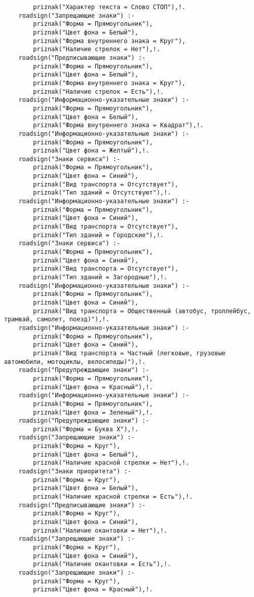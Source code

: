 \begin{verbatim}
		priznak("Характер текста = Слово СТОП"),!.
	roadsign("Запрещающие знаки") :-
		priznak("Форма = Прямоугольник"),
		priznak("Цвет фона = Белый"),
		priznak("Форма внутреннего знака = Круг"),
		priznak("Наличие стрелок = Нет"),!.
	roadsign("Предписывающие знаки") :-
		priznak("Форма = Прямоугольник"),
		priznak("Цвет фона = Белый"),
		priznak("Форма внутреннего знака = Круг"),
		priznak("Наличие стрелок = Есть"),!.
	roadsign("Информационно-указательные знаки") :-
		priznak("Форма = Прямоугольник"),
		priznak("Цвет фона = Белый"),
		priznak("Форма внутреннего знака = Квадрат"),!.
	roadsign("Информационно-указательные знаки") :-
		priznak("Форма = Прямоугольник"),
		priznak("Цвет фона = Желтый"),!.
	roadsign("Знаки сервиса") :-
		priznak("Форма = Прямоугольник"),
		priznak("Цвет фона = Синий"),
		priznak("Вид транспорта = Отсутствует"),
		priznak("Тип зданий = Отсутствуют"),!.
	roadsign("Информационно-указательные знаки") :-
		priznak("Форма = Прямоугольник"),
		priznak("Цвет фона = Синий"),
		priznak("Вид транспорта = Отсутствует"),
		priznak("Тип зданий = Городские"),!.
	roadsign("Знаки сервиса") :-
		priznak("Форма = Прямоугольник"),
		priznak("Цвет фона = Синий"),
		priznak("Вид транспорта = Отсутствует"),
		priznak("Тип зданий = Загородные"),!.
	roadsign("Информационно-указательные знаки") :-
		priznak("Форма = Прямоугольник"),
		priznak("Цвет фона = Синий"),
		priznak("Вид транспорта = Общественный (автобус, троллейбус, трамвай, самолет, поезд)"),!.
	roadsign("Информационно-указательные знаки") :-
		priznak("Форма = Прямоугольник"),
		priznak("Цвет фона = Синий"),
		priznak("Вид транспорта = Частный (легковые, грузовые автомобили, мотоциклы, велосипеды)"),!.
	roadsign("Предупреждающие знаки") :-
		priznak("Форма = Прямоугольник"),
		priznak("Цвет фона = Красный"),!.
	roadsign("Информационно-указательные знаки") :-
		priznak("Форма = Прямоугольник"),
		priznak("Цвет фона = Зеленый"),!.
	roadsign("Предупреждающие знаки") :-
		priznak("Форма = Буква Х"),!.
	roadsign("Запрещающие знаки") :-
		priznak("Форма = Круг"),
		priznak("Цвет фона = Белый"),
		priznak("Наличие красной стрелки = Нет"),!.
	roadsign("Знаки приоритета") :-
		priznak("Форма = Круг"),
		priznak("Цвет фона = Белый"),
		priznak("Наличие красной стрелки = Есть"),!.
	roadsign("Предписывающие знаки") :-
		priznak("Форма = Круг"),
		priznak("Цвет фона = Синий"),
		priznak("Наличие окантовки = Нет"),!.
	roadsign("Запрещающие знаки") :-
		priznak("Форма = Круг"),
		priznak("Цвет фона = Синий"),
		priznak("Наличие окантовки = Есть"),!.
	roadsign("Запрещающие знаки") :-
		priznak("Форма = Круг"),
		priznak("Цвет фона = Красный"),!.
\end{verbatim}
